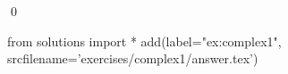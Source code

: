 
\begin{ex} 
  \label{ex:complex1}
  
  \qed
\end{ex} 
\begin{python0}
from solutions import *
add(label="ex:complex1",
    srcfilename='exercises/complex1/answer.tex') 
\end{python0}
